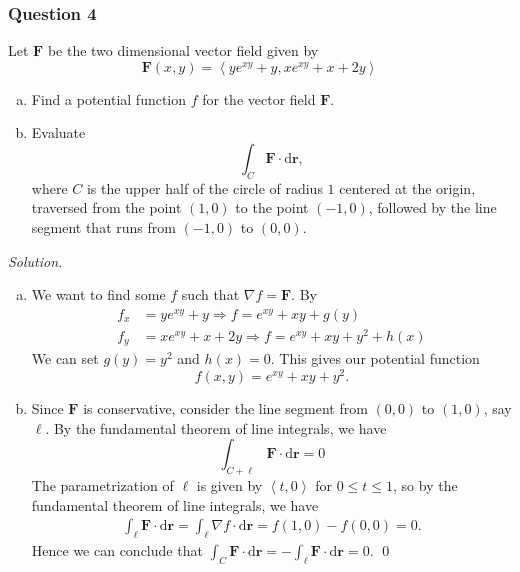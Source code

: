 \documentclass[12pt, twoside=false]{scrbook}
\newcommand{\vc}[1]{\textbf{{#1}}}
\newcommand{\pvc}[1]{\left\langle {#1} \right\rangle}
\newcounter{a}
\begin{document}
\subsubsection*{Question 4}
Let $\vc{F}$ be the two dimensional vector field given by
    $$\vc{F}(x, y)=\pvc{ye^{xy}+y, xe^{xy}+x+2y}$$
    \begin{enumerate}[(a)]
    \itemsep 0em
        \item Find a potential function $f$ for the vector field $\vc{F}$.
        \item Evaluate \[\displaystyle\int_C\vc{F}\cdot\text{d}\vc{r},\] where $C$ is the upper half of the circle of radius $1$ centered at the origin, traversed from the point $(1, 0)$ to the point $(-1, 0)$, followed by the line segment that runs from $(-1, 0)$ to $(0, 0)$.
    \end{enumerate}
\noindent\emph{Solution.}
\begin{enumerate}[(a)]
\itemsep 0em
    \item We want to find some $f$ such that $\nabla f=\vc{F}$. By
    \begin{align*}
        f_x &= ye^{xy}+y \Longrightarrow f=e^{xy}+xy+g(y)\\
        f_y &= xe^{xy}+x+2y \Longrightarrow f=e^{xy}+xy+y^2+h(x)
    \end{align*}
    We can set $g(y)=y^2$ and $h(x)=0$. This gives our potential function
    $$f(x, y)=e^{xy}+xy+y^2.$$
    \item Since $\vc{F}$ is conservative, consider the line segment from $(0, 0)$ to $(1, 0)$, say $\ell$. By the fundamental theorem of line integrals, we have 
    $$\int_{C+\ell}\vc{F}\cdot\text{d}\vc{r}=0$$
    The parametrization of $\ell$ is given by $\pvc{t, 0}$ for $0\leq t\leq 1$, so by the fundamental theorem of line integrals, we have 
    \begin{align*}
        \int_\ell\vc{F}\cdot\text{d}\vc{r} = \int_\ell\nabla f\cdot\text{d}\vc{r}= f(1, 0)-f(0,0)= 0.
    \end{align*}
    Hence we can conclude that $\displaystyle\int_C\vc{F}\cdot\text{d}\vc{r}=-\int_\ell\vc{F}\cdot\text{d}\vc{r}=0$. \qed 
\end{enumerate}
\end{document}
